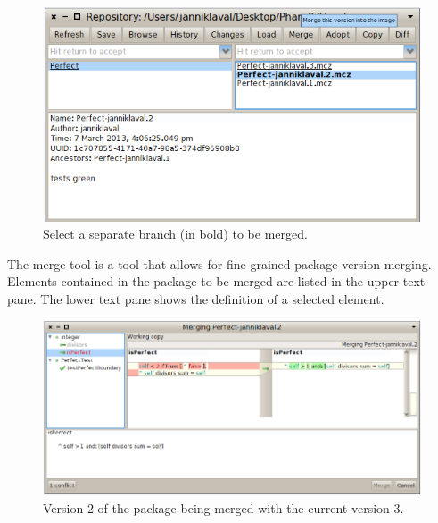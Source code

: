 \documentclass[a4paper,10pt,twoside]{book}
\begin{document}



\begin{figure}[ht]\centering
	\includegraphics[width=\textwidth]{mergeButton}
	\caption{Select a separate branch (in bold) to be merged.}
\end{figure}


The merge tool is a tool that allows for fine-grained package version merging. Elements contained in the package to-be-merged are listed in the upper text pane. The lower text pane shows the definition of a selected element. 

\begin{figure}[ht]\centering
	\includegraphics[width=\textwidth]{mergeTool}
	\caption{Version 2 of the  package being merged with the current version 3.
	}
\end{figure}
\end{document}
